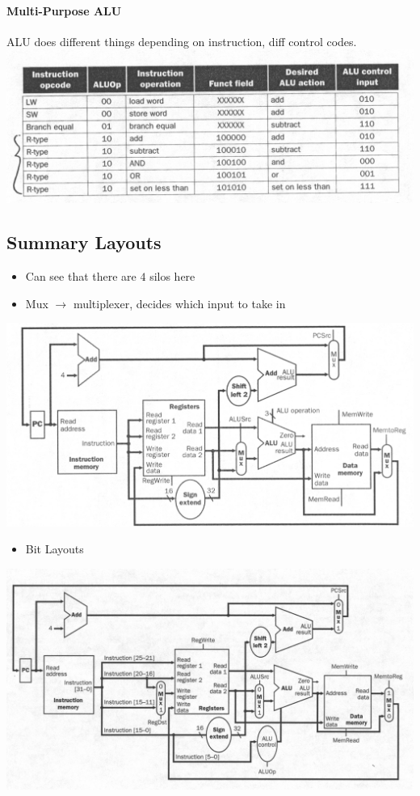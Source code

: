 \documentclass[12 pt]{article}
\begin{document}
		\paragraph{Multi-Purpose ALU} ALU does different things depending on instruction, diff control codes. \\ \includegraphics[scale=0.4]{malu}
	\subsection{Summary Layouts}
	\begin{itemize}
	\item Can see that there are $4$ silos here
	\item Mux $\to$ multiplexer, decides which input to take in
\end{itemize}
	\includegraphics[scale=0.3]{slp}
	\begin{itemize}
	\item Bit Layouts
\end{itemize}
\includegraphics[scale=0.3]{slp2}
\end{document}
